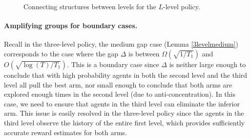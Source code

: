 \begin{figure}[H]
\centering
{}
\caption{Connecting structures between levels for the $L$-level policy.}
\label{fig:llevel-connecting}
\end{figure}

\paragraph{Amplifying groups for boundary cases.} Recall in the
three-level policy, the medium gap case (Lemma \ref{3levelmedium})
corresponds to the case where the gap $\Delta$ is between
$\Omega\left(\sqrt{{1}/{T_1}}\right)$ and
$O\left(\sqrt{{\log(T)}/{T_1}}\right)$. This is a boundary case since
$\Delta$ is neither large enough to conclude that with high
probability agents in both the second level and the third level all
pull the best arm, nor small enough to conclude that both arms are
explored enough times in the second level (due to
anti-concentration). In this case, we need to ensure that agents in
the third level can eliminate the inferior arm. This issue is easily
resolved in the three-level policy since the agents in the third level
observe the history of the entire first level, which provides
sufficiently accurate reward estimates for both arms.

